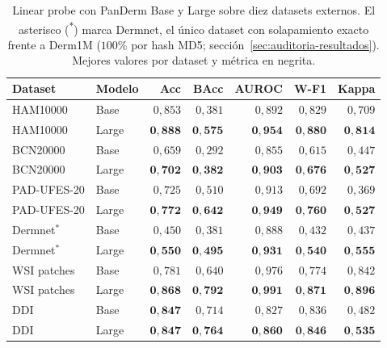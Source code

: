 \begin{table}[htbp]
\centering
\footnotesize
\setlength{\tabcolsep}{4pt}
\renewcommand{\arraystretch}{0.95}
\caption{Linear probe con PanDerm Base y Large sobre diez datasets
externos. El asterisco (\textsuperscript{$\ast$}) marca Dermnet, el
único dataset con solapamiento exacto frente a Derm1M ($100\%$ por
hash MD5; sección~\ref{sec:auditoria-resultados}).
Mejores valores por dataset y métrica en negrita.}
\label{tab:lp-panderm}
\begin{tabular}{llrrrrr}
\hline
Dataset       & Modelo & Acc            & BAcc           & AUROC          & W-F1           & Kappa \\
\hline
HAM10000      & Base   & $0{,}853$      & $0{,}381$      & $0{,}892$      & $0{,}829$      & $0{,}709$ \\
HAM10000      & Large  & $\mathbf{0{,}888}$ & $\mathbf{0{,}575}$ & $\mathbf{0{,}954}$ & $\mathbf{0{,}880}$ & $\mathbf{0{,}814}$ \\
BCN20000      & Base   & $0{,}659$      & $0{,}292$      & $0{,}855$      & $0{,}615$      & $0{,}447$ \\
BCN20000      & Large  & $\mathbf{0{,}702}$ & $\mathbf{0{,}382}$ & $\mathbf{0{,}903}$ & $\mathbf{0{,}676}$ & $\mathbf{0{,}527}$ \\
PAD-UFES-20   & Base   & $0{,}725$      & $0{,}510$      & $0{,}913$      & $0{,}692$      & $0{,}369$ \\
PAD-UFES-20   & Large  & $\mathbf{0{,}772}$ & $\mathbf{0{,}642}$ & $\mathbf{0{,}949}$ & $\mathbf{0{,}760}$ & $\mathbf{0{,}527}$ \\
Dermnet$^\ast$& Base   & $0{,}450$      & $0{,}381$      & $0{,}888$      & $0{,}432$      & $0{,}437$ \\
Dermnet$^\ast$& Large  & $\mathbf{0{,}550}$ & $\mathbf{0{,}495}$ & $\mathbf{0{,}931}$ & $\mathbf{0{,}540}$ & $\mathbf{0{,}555}$ \\
WSI patches   & Base   & $0{,}781$      & $0{,}640$      & $0{,}976$      & $0{,}774$      & $0{,}842$ \\
WSI patches   & Large  & $\mathbf{0{,}868}$ & $\mathbf{0{,}792}$ & $\mathbf{0{,}991}$ & $\mathbf{0{,}871}$ & $\mathbf{0{,}896}$ \\
DDI           & Base   & $\mathbf{0{,}847}$ & $0{,}714$      & $0{,}827$      & $0{,}836$      & $0{,}482$ \\
DDI           & Large  & $\mathbf{0{,}847}$ & $\mathbf{0{,}764}$ & $\mathbf{0{,}860}$ & $\mathbf{0{,}846}$ & $\mathbf{0{,}535}$ \\

\end{tabular}
\end{table}
